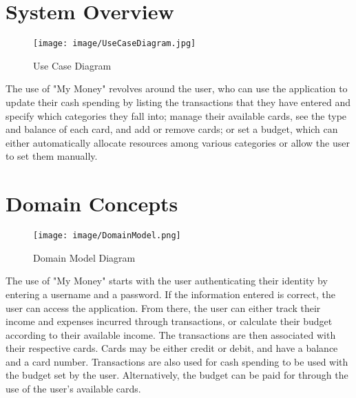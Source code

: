 \documentclass[12pt]{article}
\begin{document}
\section{System Overview}
\begin{figure}[h!]
\texttt{[image: image/UseCaseDiagram.jpg]} \\

 \caption{Use Case Diagram}
 
 
 \end{figure}
 The use of "My Money" revolves around the user, who can use the application to update their cash spending by listing the transactions that they have entered and specify which categories they fall into; manage their available cards, see the type and balance of each card, and add or remove cards; or set a budget, which can either automatically allocate resources among various categories or allow the user to set them manually. \\


\section{Domain Concepts}
\begin{figure}[ht!]
\texttt{[image: image/DomainModel.png]}\\
 
 \caption{Domain Model Diagram}
 
 
 \end{figure}
The use of "My Money" starts with the user authenticating their identity by entering a username and a password. If the information entered is correct, the user can access the application. From there, the user can either track their income and expenses incurred through transactions, or calculate their budget according to their available income. The transactions are then associated with their respective cards. Cards may be either credit or debit, and have a balance and a card number. Transactions are also used for cash spending to be used with the budget set by the user. Alternatively, the budget can be paid for through the use of the user's available cards.\\

\clearpage
\end{document}
